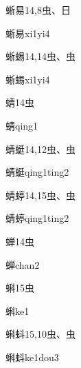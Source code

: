 \begin{Entry}{蜥易}{14,8}{⾍、⽇}
  \begin{Phonetics}{蜥易}{xi1yi4}
  \end{Phonetics}
\end{Entry}

\begin{Entry}{蜥蜴}{14,14}{⾍、⾍}
  \begin{Phonetics}{蜥蜴}{xi1yi4}
  \end{Phonetics}
\end{Entry}

\begin{Entry}{蜻}{14}{⾍}
  \begin{Phonetics}{蜻}{qing1}
  \end{Phonetics}
\end{Entry}

\begin{Entry}{蜻蜓}{14,12}{⾍、⾍}
  \begin{Phonetics}{蜻蜓}{qing1ting2}
  \end{Phonetics}
\end{Entry}

\begin{Entry}{蜻蝏}{14,15}{⾍、⾍}
  \begin{Phonetics}{蜻蝏}{qing1ting2}
  \end{Phonetics}
\end{Entry}

\begin{Entry}{蝉}{14}{⾍}
  \begin{Phonetics}{蝉}{chan2}
  \end{Phonetics}
\end{Entry}

\begin{Entry}{蝌}{15}{⾍}
  \begin{Phonetics}{蝌}{ke1}
  \end{Phonetics}
\end{Entry}

\begin{Entry}{蝌蚪}{15,10}{⾍、⾍}
  \begin{Phonetics}{蝌蚪}{ke1dou3}
  \end{Phonetics}
\end{Entry}

